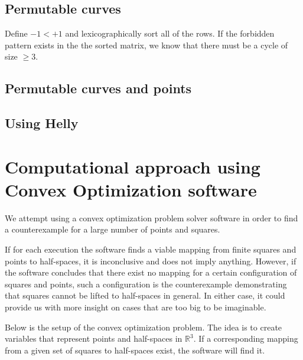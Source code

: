 \documentclass{NSF}
\begin{document}
\subsection{Permutable curves}

Define $-1 < +1$ and lexicographically sort all of the rows. If the forbidden pattern exists in the the sorted matrix, we know that there must be a cycle of size $\geq 3$.

\subsection{Permutable curves and points}

\subsection{Using Helly}

\section{Computational approach using Convex Optimization software}
We attempt using a convex optimization problem solver software in order to find a counterexample for a large number of points and squares. 

If for each execution the software finds a viable mapping from finite squares and points to half-spaces, it is inconclusive and does not imply anything. However, if the software concludes that there exist no mapping for a certain configuration of squares and points, such a configuration is the counterexample demonstrating that squares cannot be lifted to half-spaces in general. In either case, it could provide us with more insight on cases that are too big to be imaginable.

Below is the setup of the convex optimization problem. The idea is to create variables that represent points and half-spaces in $\mathbb{R}^3$. If a corresponding mapping from a given set of squares to half-spaces exist, the software will find it.
\end{document}
